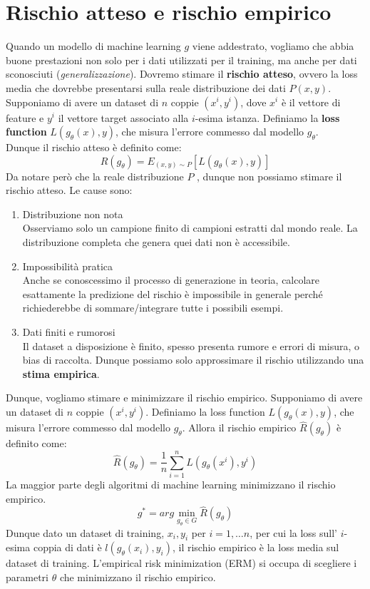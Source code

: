 \section{Rischio atteso e rischio empirico}
Quando un modello di machine learning $g$ viene addestrato, vogliamo che abbia buone prestazioni non solo per i dati utilizzati per il training, ma anche per dati sconosciuti (\textit{generalizzazione}).
Dovremo stimare il \textbf{rischio atteso}, ovvero la loss media che dovrebbe presentarsi sulla reale distribuzione dei dati $P(x,y)$. 
\\
Supponiamo di avere un dataset di $n$ coppie $(x^i,y^i)$, dove $x^i$ è il vettore di feature e $y^i$ il vettore target associato alla $i$-esima istanza.
Definiamo la \textbf{loss function} $L(g_\theta(x),y)$, che misura l'errore commesso dal modello $g_\theta$.
\\
Dunque il rischio atteso è definito come:
$$R(g_\theta)=E_{(x,y)\sim P}[L(g_\theta(x),y)]$$
Da notare però che la reale distribuzione $P$ , dunque non possiamo stimare il rischio atteso. Le cause sono:
\begin{enumerate}
	\item Distribuzione non nota \\
		Osserviamo solo un campione finito di campioni estratti dal mondo reale. La distribuzione completa che genera quei dati non è accessibile.
	\item Impossibilità pratica\\
		Anche se conoscessimo il processo di generazione in teoria, calcolare esattamente la predizione del rischio è impossibile in generale perché richiederebbe di sommare/integrare tutte i possibili esempi.
	\item Dati finiti e rumorosi\\
		Il dataset a disposizione è finito, spesso presenta rumore e errori di misura, o bias di raccolta. Dunque possiamo solo approssimare il rischio utilizzando una \textbf{stima empirica}.
\end{enumerate}
Dunque, vogliamo stimare e minimizzare il rischio empirico. Supponiamo di avere un dataset di $n$ coppie $(x^i,y^i)$.
Definiamo la loss function $L(g_\theta(x),y)$, che misura l'errore commesso dal modello $g_\theta$.
Allora il rischio empirico $\hat{R}(g_\theta)$ è definito come:
$$\hat{R}(g_\theta)=\frac{1}{n}\sum_{i=1}^n L(g_\theta(x^i),y^i)$$
La maggior parte degli algoritmi di machine learning minimizzano il rischio empirico.
$$g^*=arg\min_{g_\theta\in G}\hat{R}(g_\theta)$$
Dunque dato un dataset di training, $x_i,y_i$ per $i=1,\dots n$, per cui la loss sull' $i$-esima coppia di dati è $l(g_\theta(x_i),y_i)$, il rischio empirico è la loss media sul dataset di training.
L'empirical risk minimization (ERM) si occupa di scegliere i parametri $\theta$ che minimizzano il rischio empirico.
